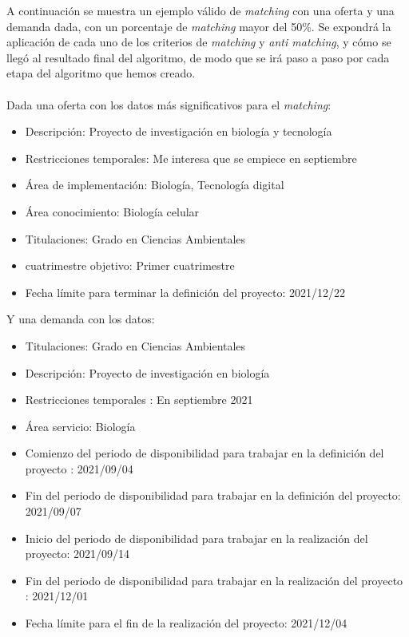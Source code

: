 \documentclass[11pt]{book}
\begin{document}
A continuación se muestra un ejemplo válido de \emph{matching} con una oferta y una demanda dada, con un porcentaje de \emph{matching} mayor del 50\%. Se expondrá la aplicación de cada uno de los criterios de \emph{matching} y \emph{anti matching}, y cómo se llegó al resultado final del algoritmo, de modo que se irá paso a paso por cada etapa del algoritmo que hemos creado.\\\\
Dada una oferta con los datos más significativos para el \emph{matching}:\\
\begin{itemize} 
	\item Descripción: Proyecto de investigación en biología y tecnología
	\item Restricciones temporales: Me interesa que se empiece en septiembre
	\item Área de implementación: Biología, Tecnología digital
	\item Área conocimiento: Biología celular
	\item Titulaciones: Grado en Ciencias Ambientales
	\item cuatrimestre objetivo: Primer cuatrimestre
	\item Fecha límite para terminar la definición del proyecto: 2021/12/22
	\\
\end{itemize}
Y una demanda con los datos:\\
\begin{itemize} 
	\item Titulaciones: Grado en Ciencias Ambientales
	\item Descripción: Proyecto de investigación en biología
	\item Restricciones temporales : En septiembre 2021
	\item Área servicio: Biología
	\item Comienzo del periodo de disponibilidad para trabajar en la definición del
	proyecto : 2021/09/04
	\item Fin del periodo de disponibilidad para trabajar en la definición del
	proyecto: 2021/09/07
	\item Inicio del periodo de disponibilidad para trabajar en la realización del
	proyecto: 2021/09/14
	\item Fin del periodo de disponibilidad para trabajar en la realización del
	proyecto : 2021/12/01
	\item Fecha límite para el fin de la realización del proyecto: 2021/12/04
\end{itemize}
\end{document}
